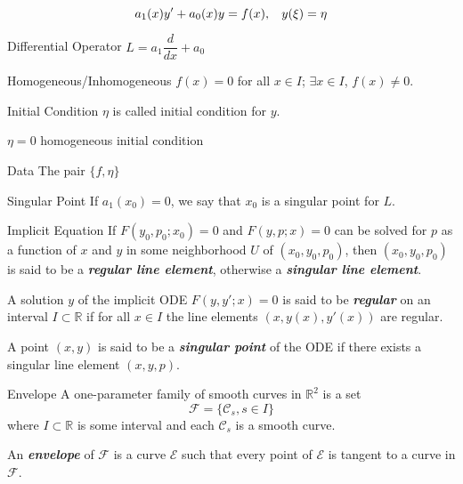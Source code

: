 \documentclass{beamer}
\begin{document}
\begin{frame}
$$a_1(x)y'+a_0(x)y=f(x),\hspace{3mm}y(\xi)=\eta$$
\begin{block}{Differential Operator}
$L=a_1\dfrac{d}{dx}+a_0$
\end{block}
\begin{block}{Homogeneous/Inhomogeneous}
$f(x)=0$ for all $x\in I$; $\exists x\in I$, $f(x)\neq0$.
\end{block}
\begin{block}{Initial Condition}
$\eta$ is called initial condition for $y$.

$\eta=0$ homogeneous initial condition
\end{block}
\begin{block}{Data}
The pair $\lbrace f,\eta\rbrace$
\end{block}
\begin{block}{Singular Point}
If $a_1(x_0) = 0$, we say that $x_0$ is a singular point for $L$.
\end{block}

\end{frame}
\begin{frame}
\begin{block}{Implicit Equation}
If $F(y_0, p_0; x_0) = 0$ and $F(y,p;x)=0$ can be solved for $p$ as a
function of $x$ and $y$ in some neighborhood $U$ of $(x_0, y_0, p_0)$, then $(x_0, y_0, p_0)$ is said to be a \textbf{\textit{regular line element}}, otherwise a \textbf{\textit{singular line element}}.
\end{block}
\begin{block}{}
A solution $y$ of the implicit ODE $F(y, y'; x) = 0$ is said to be \textbf{\textit{regular}} on an interval $I \subset \mathbb{R}$ if for all $x \in I$ the line elements $(x, y(x), y'(x))$ are regular.
\end{block}
\begin{block}{}
A point $(x, y)$ is said to be a \textbf{\textit{singular point}} of the ODE if there
exists a singular line element $(x, y, p)$.
\end{block}
\end{frame}
\begin{frame}
\begin{block}{Envelope}
A one-parameter family of smooth curves in $\mathbb{R}^2$ is a
set 
$$\mathcal{F} =\lbrace \mathcal{C}_s , s \in I\rbrace$$
where $I \subset \mathbb{R}$ is some interval and each $\mathcal{C}_s$ is a smooth curve.

An \textbf{\textit{envelope}} of $\mathcal{F}$ is a curve $\mathcal{E}$ such that every point of $\mathcal{E}$ is tangent to a curve in $\mathcal{F}$.
\end{block}

\end{frame}
\end{document}
